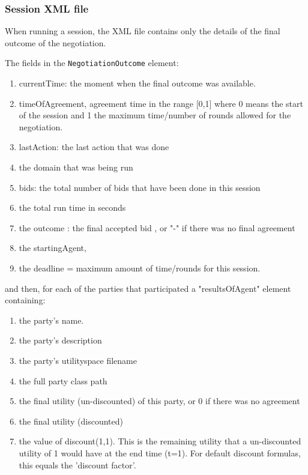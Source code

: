 \documentclass[]{article}
\begin{document}
\subsubsection{Session XML file}
When running a session, the XML file contains only the details of the final outcome of the negotiation.

The fields in the \verb|NegotiationOutcome| element:\label{table:NegotiationOutcome}
\begin{enumerate}
\item currentTime: the moment when the final outcome was available. 
\item timeOfAgreement, agreement time in the range [0,1] where 0 means the start of the session and 1 the maximum time/number of rounds allowed for the negotiation. 
\item lastAction: the last action that was done
\item the domain that was being run
\item bids: the total number of bids that have been done in this session
\item the total run time in seconds
\item the outcome : the final accepted bid , or "-" if there was no final agreement
\item the startingAgent,
\item the deadline = maximum amount of time/rounds for this session.
\end{enumerate}

and then, for each of the parties that participated a "resultsOfAgent" element containing:
\begin{enumerate}
\item the party's name. 
\item the party's description
\item the party's utilityspace filename
\item the full party class path
\item the final utility (un-discounted) of this party, or 0 if there was no agreement
\item the final utility (discounted) 
\item the value of discount(1,1). This is the remaining utility that a un-discounted utility of 1 would have at the end time (t=1). For default discount formulas, this equals the 'discount factor'.   
\end{enumerate}
\end{document}
